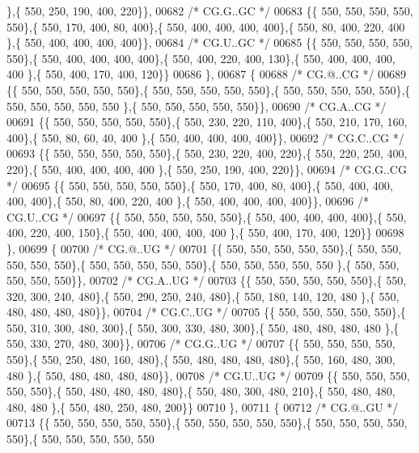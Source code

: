 \begin{DoxyCode}
      \},\{ 550, 250, 190, 400, 220\}\},
00682 \textcolor{comment}{/* CG.G..GC */}
00683 \{\{ 550, 550, 550, 550, 550\},\{ 550, 170, 400,  80, 400\},\{ 550, 400, 400, 400, 400\},\{ 550,  80, 400, 220, 400
      \},\{ 550, 400, 400, 400, 400\}\},
00684 \textcolor{comment}{/* CG.U..GC */}
00685 \{\{ 550, 550, 550, 550, 550\},\{ 550, 400, 400, 400, 400\},\{ 550, 400, 220, 400, 130\},\{ 550, 400, 400, 400, 400
      \},\{ 550, 400, 170, 400, 120\}\}
00686 \},
00687 \{
00688 \textcolor{comment}{/* CG.@..CG */}
00689 \{\{ 550, 550, 550, 550, 550\},\{ 550, 550, 550, 550, 550\},\{ 550, 550, 550, 550, 550\},\{ 550, 550, 550, 550, 550
      \},\{ 550, 550, 550, 550, 550\}\},
00690 \textcolor{comment}{/* CG.A..CG */}
00691 \{\{ 550, 550, 550, 550, 550\},\{ 550, 230, 220, 110, 400\},\{ 550, 210, 170, 160, 400\},\{ 550,  80,  60,  40, 400
      \},\{ 550, 400, 400, 400, 400\}\},
00692 \textcolor{comment}{/* CG.C..CG */}
00693 \{\{ 550, 550, 550, 550, 550\},\{ 550, 230, 220, 400, 220\},\{ 550, 220, 250, 400, 220\},\{ 550, 400, 400, 400, 400
      \},\{ 550, 250, 190, 400, 220\}\},
00694 \textcolor{comment}{/* CG.G..CG */}
00695 \{\{ 550, 550, 550, 550, 550\},\{ 550, 170, 400,  80, 400\},\{ 550, 400, 400, 400, 400\},\{ 550,  80, 400, 220, 400
      \},\{ 550, 400, 400, 400, 400\}\},
00696 \textcolor{comment}{/* CG.U..CG */}
00697 \{\{ 550, 550, 550, 550, 550\},\{ 550, 400, 400, 400, 400\},\{ 550, 400, 220, 400, 150\},\{ 550, 400, 400, 400, 400
      \},\{ 550, 400, 170, 400, 120\}\}
00698 \},
00699 \{
00700 \textcolor{comment}{/* CG.@..UG */}
00701 \{\{ 550, 550, 550, 550, 550\},\{ 550, 550, 550, 550, 550\},\{ 550, 550, 550, 550, 550\},\{ 550, 550, 550, 550, 550
      \},\{ 550, 550, 550, 550, 550\}\},
00702 \textcolor{comment}{/* CG.A..UG */}
00703 \{\{ 550, 550, 550, 550, 550\},\{ 550, 320, 300, 240, 480\},\{ 550, 290, 250, 240, 480\},\{ 550, 180, 140, 120, 480
      \},\{ 550, 480, 480, 480, 480\}\},
00704 \textcolor{comment}{/* CG.C..UG */}
00705 \{\{ 550, 550, 550, 550, 550\},\{ 550, 310, 300, 480, 300\},\{ 550, 300, 330, 480, 300\},\{ 550, 480, 480, 480, 480
      \},\{ 550, 330, 270, 480, 300\}\},
00706 \textcolor{comment}{/* CG.G..UG */}
00707 \{\{ 550, 550, 550, 550, 550\},\{ 550, 250, 480, 160, 480\},\{ 550, 480, 480, 480, 480\},\{ 550, 160, 480, 300, 480
      \},\{ 550, 480, 480, 480, 480\}\},
00708 \textcolor{comment}{/* CG.U..UG */}
00709 \{\{ 550, 550, 550, 550, 550\},\{ 550, 480, 480, 480, 480\},\{ 550, 480, 300, 480, 210\},\{ 550, 480, 480, 480, 480
      \},\{ 550, 480, 250, 480, 200\}\}
00710 \},
00711 \{
00712 \textcolor{comment}{/* CG.@..GU */}
00713 \{\{ 550, 550, 550, 550, 550\},\{ 550, 550, 550, 550, 550\},\{ 550, 550, 550, 550, 550\},\{ 550, 550, 550, 550, 550

\end{DoxyCode}
